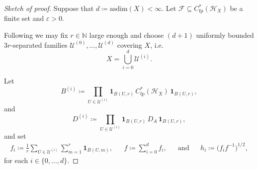\documentclass[a4paper]{amsart}
\newcommand{\myhyp}{\textnormal{-}\hskip0pt\relax}
\numberwithin{equation}{section}
\newcommand{\N}{\mathbb{N}}
\newcommand{\Fcal}{\mathcal{F}}
\newcommand{\Hcal}{\mathcal{H}}
\newcommand{\e}{\varepsilon}
\newcommand{\indF}{\mathbf{1}}
\newcommand{\Cfp}[1]{C^{\ast}_{\mathrm{fp}}({#1})}
\newcommand{\ball}[3]{{B_{#1} (#2,#3)}}
\newcommand{\asdim}[1]{\mathrm{asdim}({#1})}
\theoremstyle{plain}
\theoremstyle{indented}
\numberwithin{equation}{section}
\theoremstyle{definition}
\theoremstyle{remark}
\theoremstyle{plain}
\theoremstyle{definition}
\begin{document}
\begin{proof}[Sketch of proof]
    Suppose that $d \coloneq \asdim{X} < \infty$.
    Let $\Fcal \subseteq \Cfp{\Hcal_X}$ be a finite set and $\e>0$.

    Following \cite[Theorem~7.7]{LiLiaoWinter2023diagDim} we may fix ${r \in \N}$ large enough and choose
     ${(d+1)}$ uniformly bounded 
     $3r$\myhyp{}separated families ${\mathcal{U}^{(0)},\hdots,\mathcal{U}^{(d)}}$
     covering $X$, i.e.
     \[X= \bigcup_{i=0}^d \mathcal{U}^{(i)}.\]

     Let
     \begin{equation*}
         B^{(i)} \coloneq \prod_{U \in \mathcal{U}^{(i)}} \indF_{\ball{}{U}{r}} \,  \Cfp{\Hcal_X} \, \indF_{\ball{}{U}{r}},
     \end{equation*}
     and
     \begin{equation*}
         D^{(i)} \coloneq  \prod_{U \in \mathcal{U}^{(i)}} \indF_{\ball{}{U}{r}} \,  D_A \, \indF_{\ball{}{U}{r}},
     \end{equation*}
    and set
      \begin{align*}
        f_i \coloneq \frac{1}{r} \sum_{U \in \mathcal{U}^{(i)}} \sum_{m=1}^{r} \indF_{\ball{}{U}{m}},
    &&
        f \coloneq \sum_{i=0}^d f_i,
   && \text{and}
   &&
        h_i \coloneq \big( f_i f^{-1} \big)^{1/2}, 
    \end{align*}
    for each ${i \in \{0,\hdots,d\}}$.


\end{proof}
\end{document}
